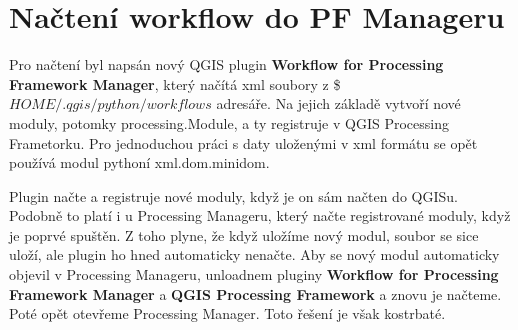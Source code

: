 \newpage
\section{Načtení workflow do PF Manageru}
Pro načtení byl napsán nový QGIS plugin \textbf{Workflow for Processing Framework Manager}, který načítá xml soubory z \$$HOME/.qgis/python/workflows$ adresáře. Na jejich základě vytvoří nové moduly, potomky processing.Module, a ty registruje v QGIS Processing Frametorku. Pro jednoduchou práci s daty uloženými v xml formátu se opět používá modul pythoní xml.dom.minidom.

Plugin načte a registruje nové moduly, když je on sám načten do QGISu. Podobně to platí i u Processing Manageru, který načte registrované moduly, když je poprvé spuštěn. Z toho plyne, že když uložíme nový modul, soubor se sice uloží, ale plugin ho hned automaticky nenačte. Aby se nový modul automaticky objevil v Processing Manageru, {\color{red}unloadnem} pluginy \textbf{Workflow for Processing Framework Manager} a \textbf{QGIS Processing Framework} a znovu je načteme. Poté opět otevřeme Processing Manager. Toto řešení je však kostrbaté.